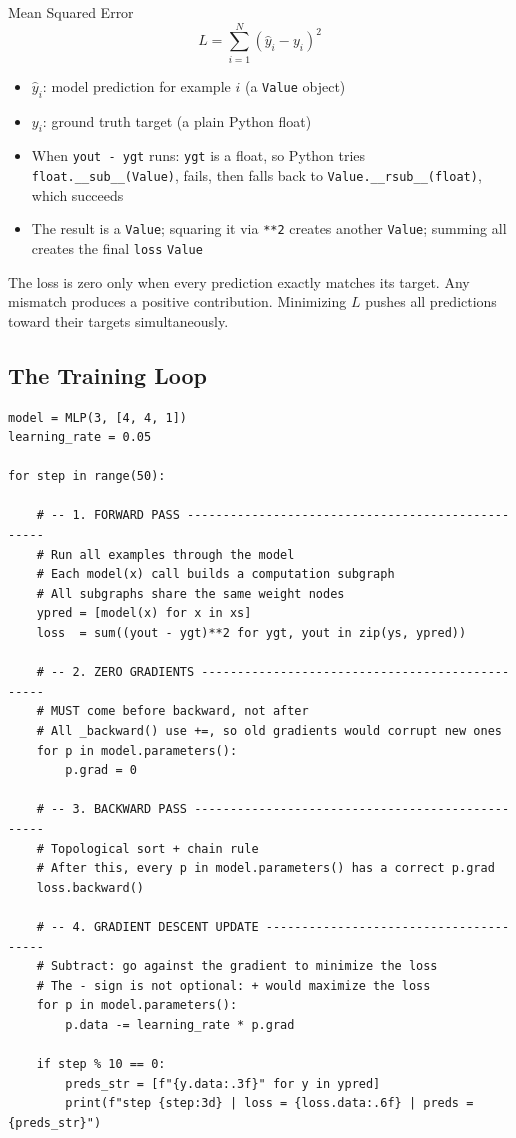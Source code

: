 \documentclass[12pt,a4paper]{article}
\newcommand{\code}[1]{\texttt{\small\color{deepblue}#1}}
\begin{document}
\begin{mathbox}{Mean Squared Error}
\[
L = \sum_{i=1}^{N} (\hat{y}_i - y_i)^2
\]
\begin{itemize}
  \item $\hat{y}_i$: model prediction for example $i$ (a \code{Value} object)
  \item $y_i$: ground truth target (a plain Python float)
  \item When \code{yout - ygt} runs: \code{ygt} is a float, so Python tries \code{float.\_\_sub\_\_(Value)}, fails, then falls back to \code{Value.\_\_rsub\_\_(float)}, which succeeds
  \item The result is a \code{Value}; squaring it via \code{**2} creates another \code{Value}; summing all creates the final \code{loss} \code{Value}
\end{itemize}
The loss is zero only when every prediction exactly matches its target. Any mismatch produces a positive contribution. Minimizing $L$ pushes all predictions toward their targets simultaneously.
\end{mathbox}

\subsection{The Training Loop}

\begin{lstlisting}
model = MLP(3, [4, 4, 1])
learning_rate = 0.05

for step in range(50):

    # -- 1. FORWARD PASS --------------------------------------------------
    # Run all examples through the model
    # Each model(x) call builds a computation subgraph
    # All subgraphs share the same weight nodes
    ypred = [model(x) for x in xs]
    loss  = sum((yout - ygt)**2 for ygt, yout in zip(ys, ypred))

    # -- 2. ZERO GRADIENTS ------------------------------------------------
    # MUST come before backward, not after
    # All _backward() use +=, so old gradients would corrupt new ones
    for p in model.parameters():
        p.grad = 0

    # -- 3. BACKWARD PASS -------------------------------------------------
    # Topological sort + chain rule
    # After this, every p in model.parameters() has a correct p.grad
    loss.backward()

    # -- 4. GRADIENT DESCENT UPDATE ---------------------------------------
    # Subtract: go against the gradient to minimize the loss
    # The - sign is not optional: + would maximize the loss
    for p in model.parameters():
        p.data -= learning_rate * p.grad

    if step % 10 == 0:
        preds_str = [f"{y.data:.3f}" for y in ypred]
        print(f"step {step:3d} | loss = {loss.data:.6f} | preds = {preds_str}")
\end{lstlisting}
\end{document}
